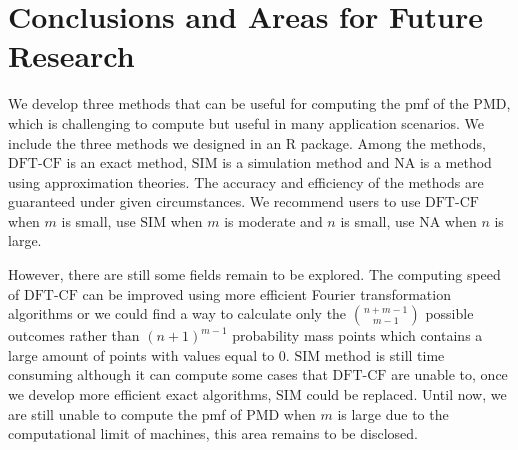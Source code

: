 \documentclass[12pt]{article}
\newcommand{\PMD}{\textrm{PMD}}
\newcommand{\SIM}{{\textrm{SIM}}}
\newcommand{\NA}{{\textrm{NA}}}
\newcommand{\dft}{{\textrm{DFT-CF}}}
\begin{document}



\section{Conclusions and Areas for Future Research}\label{sec:conclusion}

We develop three methods that can be useful for computing the pmf of the PMD, which is challenging to compute but useful in many application scenarios. We include the three methods we designed in an R package. Among the methods, $\dft$ is an exact method, $\SIM$ is a simulation method and $\NA$ is a method using approximation theories. The accuracy and efficiency of the methods are guaranteed under given circumstances. We recommend users to use $\dft$ when $m$ is small, use $\SIM$ when $m$ is moderate and $n$ is small, use $\NA$ when $n$ is large.


However, there are still some fields remain to be explored. The computing speed of $\dft$ can be improved using more efficient Fourier transformation algorithms or we could find a way to calculate only the $\binom{n+m-1}{m-1}$ possible outcomes rather than $(n+1)^{m-1}$ probability mass points which contains a large amount of points with values equal to 0. $\SIM$ method is still time consuming although it can compute some cases that $\dft$ are unable to, once we develop more efficient exact algorithms, $\SIM$ could be replaced. Until now, we are still unable to compute the pmf of $\PMD$ when $m$ is large due to the computational limit of machines, this area remains to be disclosed.
\end{document}

